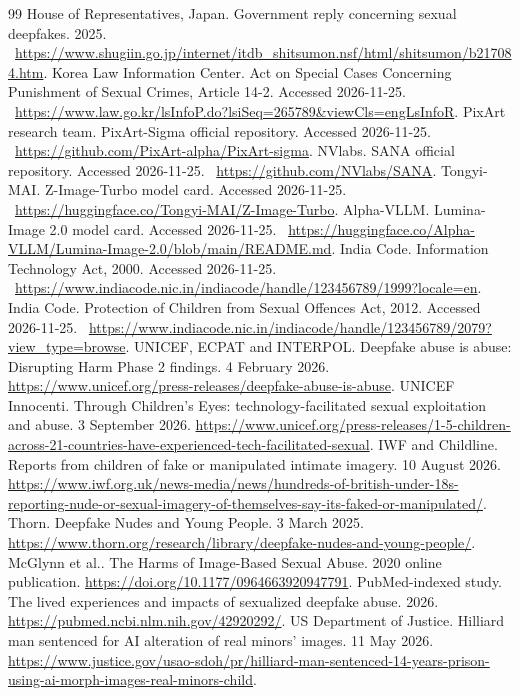 \documentclass[10pt,a4paper]{article}
\begin{document}
\begin{thebibliography}{99}
 House of Representatives, Japan. Government reply concerning sexual deepfakes. 2025. \ \url{https://www.shugiin.go.jp/internet/itdb_shitsumon.nsf/html/shitsumon/b217084.htm}.
 Korea Law Information Center. Act on Special Cases Concerning Punishment of Sexual Crimes, Article 14-2. Accessed 2026-11-25. \ \url{https://www.law.go.kr/lsInfoP.do?lsiSeq=265789&viewCls=engLsInfoR}.
 PixArt research team. PixArt-Sigma official repository. Accessed 2026-11-25. \ \url{https://github.com/PixArt-alpha/PixArt-sigma}.
 NVlabs. SANA official repository. Accessed 2026-11-25. \ \url{https://github.com/NVlabs/SANA}.
 Tongyi-MAI. Z-Image-Turbo model card. Accessed 2026-11-25. \ \url{https://huggingface.co/Tongyi-MAI/Z-Image-Turbo}.
 Alpha-VLLM. Lumina-Image 2.0 model card. Accessed 2026-11-25. \ \url{https://huggingface.co/Alpha-VLLM/Lumina-Image-2.0/blob/main/README.md}.
 India Code. Information Technology Act, 2000. Accessed 2026-11-25. \ \url{https://www.indiacode.nic.in/indiacode/handle/123456789/1999?locale=en}.
 India Code. Protection of Children from Sexual Offences Act, 2012. Accessed 2026-11-25. \ \url{https://www.indiacode.nic.in/indiacode/handle/123456789/2079?view_type=browse}.
 UNICEF, ECPAT and INTERPOL. Deepfake abuse is abuse: Disrupting Harm Phase 2 findings. 4 February 2026. \url{https://www.unicef.org/press-releases/deepfake-abuse-is-abuse}.
 UNICEF Innocenti. Through Children's Eyes: technology-facilitated sexual exploitation and abuse. 3 September 2026. \url{https://www.unicef.org/press-releases/1-5-children-across-21-countries-have-experienced-tech-facilitated-sexual}.
 IWF and Childline. Reports from children of fake or manipulated intimate imagery. 10 August 2026. \url{https://www.iwf.org.uk/news-media/news/hundreds-of-british-under-18s-reporting-nude-or-sexual-imagery-of-themselves-say-its-faked-or-manipulated/}.
 Thorn. Deepfake Nudes and Young People. 3 March 2025. \url{https://www.thorn.org/research/library/deepfake-nudes-and-young-people/}.
 McGlynn et al.. The Harms of Image-Based Sexual Abuse. 2020 online publication. \url{https://doi.org/10.1177/0964663920947791}.
 PubMed-indexed study. The lived experiences and impacts of sexualized deepfake abuse. 2026. \url{https://pubmed.ncbi.nlm.nih.gov/42920292/}.
 US Department of Justice. Hilliard man sentenced for AI alteration of real minors' images. 11 May 2026. \url{https://www.justice.gov/usao-sdoh/pr/hilliard-man-sentenced-14-years-prison-using-ai-morph-images-real-minors-child}.

\end{thebibliography}
\end{document}
